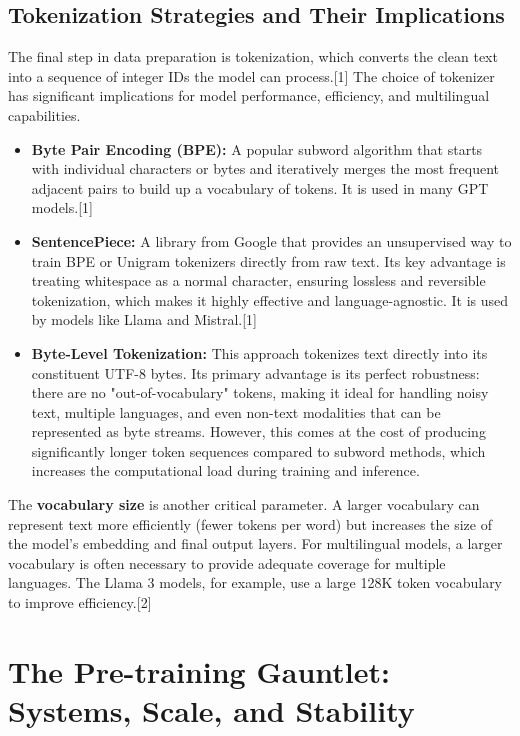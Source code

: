 \documentclass[12pt, a4paper]{article}
\begin{document}
\subsection{Tokenization Strategies and Their Implications}

The final step in data preparation is tokenization, which converts the clean text into a sequence of integer IDs the model can process.[1] The choice of tokenizer has significant implications for model performance, efficiency, and multilingual capabilities.

\begin{itemize}
    \item \textbf{Byte Pair Encoding (BPE):} A popular subword algorithm that starts with individual characters or bytes and iteratively merges the most frequent adjacent pairs to build up a vocabulary of tokens. It is used in many GPT models.[1]
    \item \textbf{SentencePiece:} A library from Google that provides an unsupervised way to train BPE or Unigram tokenizers directly from raw text. Its key advantage is treating whitespace as a normal character, ensuring lossless and reversible tokenization, which makes it highly effective and language-agnostic. It is used by models like Llama and Mistral.[1]
    \item \textbf{Byte-Level Tokenization:} This approach tokenizes text directly into its constituent UTF-8 bytes. Its primary advantage is its perfect robustness: there are no "out-of-vocabulary" tokens, making it ideal for handling noisy text, multiple languages, and even non-text modalities that can be represented as byte streams. However, this comes at the cost of producing significantly longer token sequences compared to subword methods, which increases the computational load during training and inference.
\end{itemize}

The \textbf{vocabulary size} is another critical parameter. A larger vocabulary can represent text more efficiently (fewer tokens per word) but increases the size of the model's embedding and final output layers. For multilingual models, a larger vocabulary is often necessary to provide adequate coverage for multiple languages. The Llama 3 models, for example, use a large 128K token vocabulary to improve efficiency.[2]

\section{The Pre-training Gauntlet: Systems, Scale, and Stability}
\end{document}
